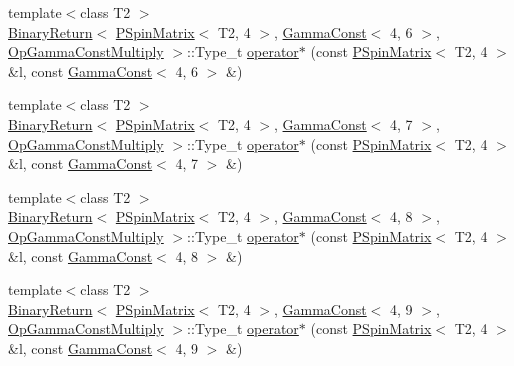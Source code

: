 \begin{DoxyCompactItemize}
\item 
{\footnotesize template$<$class T2 $>$ }\\\mbox{\hyperlink{structENSEM_1_1BinaryReturn}{Binary\+Return}}$<$ \mbox{\hyperlink{classENSEM_1_1PSpinMatrix}{P\+Spin\+Matrix}}$<$ T2, 4 $>$, \mbox{\hyperlink{classENSEM_1_1GammaConst}{Gamma\+Const}}$<$ 4, 6 $>$, \mbox{\hyperlink{structENSEM_1_1OpGammaConstMultiply}{Op\+Gamma\+Const\+Multiply}} $>$\+::Type\+\_\+t \mbox{\hyperlink{group__primspinmatrix_gaf04b1dbd5214d0a0e3a846a865a23f0e}{operator$\ast$}} (const \mbox{\hyperlink{classENSEM_1_1PSpinMatrix}{P\+Spin\+Matrix}}$<$ T2, 4 $>$ \&l, const \mbox{\hyperlink{classENSEM_1_1GammaConst}{Gamma\+Const}}$<$ 4, 6 $>$ \&)
\item 
{\footnotesize template$<$class T2 $>$ }\\\mbox{\hyperlink{structENSEM_1_1BinaryReturn}{Binary\+Return}}$<$ \mbox{\hyperlink{classENSEM_1_1PSpinMatrix}{P\+Spin\+Matrix}}$<$ T2, 4 $>$, \mbox{\hyperlink{classENSEM_1_1GammaConst}{Gamma\+Const}}$<$ 4, 7 $>$, \mbox{\hyperlink{structENSEM_1_1OpGammaConstMultiply}{Op\+Gamma\+Const\+Multiply}} $>$\+::Type\+\_\+t \mbox{\hyperlink{group__primspinmatrix_gaf6e9dc0eef99b0575741077a24d33399}{operator$\ast$}} (const \mbox{\hyperlink{classENSEM_1_1PSpinMatrix}{P\+Spin\+Matrix}}$<$ T2, 4 $>$ \&l, const \mbox{\hyperlink{classENSEM_1_1GammaConst}{Gamma\+Const}}$<$ 4, 7 $>$ \&)
\item 
{\footnotesize template$<$class T2 $>$ }\\\mbox{\hyperlink{structENSEM_1_1BinaryReturn}{Binary\+Return}}$<$ \mbox{\hyperlink{classENSEM_1_1PSpinMatrix}{P\+Spin\+Matrix}}$<$ T2, 4 $>$, \mbox{\hyperlink{classENSEM_1_1GammaConst}{Gamma\+Const}}$<$ 4, 8 $>$, \mbox{\hyperlink{structENSEM_1_1OpGammaConstMultiply}{Op\+Gamma\+Const\+Multiply}} $>$\+::Type\+\_\+t \mbox{\hyperlink{group__primspinmatrix_ga309ed45c5c034e83f1f24061ca0a5cdc}{operator$\ast$}} (const \mbox{\hyperlink{classENSEM_1_1PSpinMatrix}{P\+Spin\+Matrix}}$<$ T2, 4 $>$ \&l, const \mbox{\hyperlink{classENSEM_1_1GammaConst}{Gamma\+Const}}$<$ 4, 8 $>$ \&)
\item 
{\footnotesize template$<$class T2 $>$ }\\\mbox{\hyperlink{structENSEM_1_1BinaryReturn}{Binary\+Return}}$<$ \mbox{\hyperlink{classENSEM_1_1PSpinMatrix}{P\+Spin\+Matrix}}$<$ T2, 4 $>$, \mbox{\hyperlink{classENSEM_1_1GammaConst}{Gamma\+Const}}$<$ 4, 9 $>$, \mbox{\hyperlink{structENSEM_1_1OpGammaConstMultiply}{Op\+Gamma\+Const\+Multiply}} $>$\+::Type\+\_\+t \mbox{\hyperlink{group__primspinmatrix_ga25cb4484aedd17ae7862bb37c00fb7e0}{operator$\ast$}} (const \mbox{\hyperlink{classENSEM_1_1PSpinMatrix}{P\+Spin\+Matrix}}$<$ T2, 4 $>$ \&l, const \mbox{\hyperlink{classENSEM_1_1GammaConst}{Gamma\+Const}}$<$ 4, 9 $>$ \&)

\end{DoxyCompactItemize}
